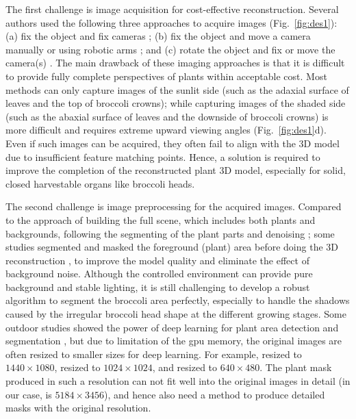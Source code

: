 

The first challenge is image acquisition for cost-effective reconstruction. Several authors used the following three approaches to acquire images (Fig.~\ref{fig:des1}): (a) fix the object and fix cameras \citep{nguyen_structured_2015}; (b) fix the object and move a camera manually \citep{xiao_image-based_2020} or using robotic arms \citep{cao_quantifying_2019,nguyen_3d_2016}; and (c) rotate the object and fix or move the camera(s) \citep{kochi_3d_2018,gao_novel_2021}. The main drawback of these imaging approaches is that it is difficult to provide fully complete perspectives of plants within acceptable cost. Most methods can only capture images of the sunlit side (such as the adaxial surface of leaves and the top of broccoli crowns); while capturing images of the shaded side (such as the abaxial surface of leaves and the downside of broccoli crowns) is more difficult and requires extreme upward viewing angles (Fig.~\ref{fig:des1}d). Even if such images can be acquired, they often fail to align with the 3D model due to insufficient feature matching points. Hence, a solution is required to improve the completion of the reconstructed plant 3D model, especially for solid, closed harvestable organs like broccoli heads.

The second challenge is image preprocessing for the acquired images. Compared to the approach of building the full scene, which includes both plants and backgrounds, following the segmenting of the plant parts \citep{ge_method_2019} and denoising \citep{wu_mvs-pheno_2020}; some studies segmented and masked the foreground (plant) area before doing the 3D reconstruction \citep{nguyen_3d_2016,kochi_3d_2018}, to improve the model quality and eliminate the effect of background noise. Although the controlled environment can provide pure background and stable lighting, it is still challenging to develop a robust algorithm to segment the broccoli area perfectly, especially to handle the shadows caused by the irregular broccoli head shape at the different growing stages. Some outdoor studies showed the power of deep learning for plant area detection and segmentation \citep{zhou_monitoring_2020,blok_effect_2021,garcia_towards_2021}, but due to limitation of the \gls{gpu} memory, the original images are often resized to smaller sizes for deep learning. For example, \citet{zhou_monitoring_2020} resized to $1440 \times 1080$, \citet{blok_effect_2021} resized to $1024 \times 1024$, and \citet{garcia_towards_2021} resized to $640 \times 480$. The plant mask produced in such a resolution can not fit well into the original images in detail (in our case, is $5184 \times 3456$), and hence also need a method to produce detailed masks with the original resolution.

